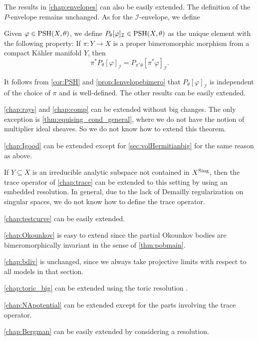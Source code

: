 The results in \cref{chap:envelopes} can also be easily extended. The definition of the $P$-envelope remains unchanged. As for the $\mathcal{I}$-envelope, we define
\begin{definition}\label{def:unibranch:L212}
    Given $\varphi\in \mathrm{PSH}(X,\theta)$, we define $P_{\theta}[\varphi]_{\mathcal{I}}\in \mathrm{PSH}(X,\theta)$ as the unique element with the following property: If $\pi\colon Y\rightarrow X$ is a proper bimeromorphic morphism from a compact K\"ahler manifold $Y$, then
    \[
        \pi^*P_{\theta}[\varphi]_{\mathcal{I}}=P_{\pi^*\theta}[\pi^*\varphi]_{\mathcal{I}}.
    \]
\end{definition}
It follows from \cref{cor:PSH} and \cref{prop:Ienvelopebimero} that $P_{\theta}[\varphi]_{\mathcal{I}}$ is independent of the choice of $\pi$ and is well-defined.
The other results can be easily extended.

\cref{chap:rays} and \cref{chap:comp} can be extended without big changes. The only exception is \cref{thm:equising_cond_general}, where we do not have the notion of multiplier ideal sheaves. So we do not know how to extend this theorem.

\cref{chap:Igood} can be extended except for \cref{sec:volHermitianbig} for the same reason as above.

If $Y\subseteq X$ is an irreducible analytic subspace not contained in $X^{\operatorname{Sing}}$, then the trace operator of \cref{chap:trace} can be extended to this setting by using an embedded resolution. In general, due to the lack of Demailly regularization on singular spaces, we do not know how to define the trace operator.

\cref{chap:testcurve} can be easily extended.

\cref{chap:Okounkov} is easy to extend since the partial Okounkov bodies are bimeromorphically invariant in the sense of \cref{thm:pobmain}.

\cref{chap:bdiv} is unchanged, since we always take projective limits with respect to all models in that section.

\cref{chap:toric_big} can be extended using the toric resolution \cite[Theorem~11.1.9]{CLS11}.

\cref{chap:NApotential} can be extended except for the parts involving the trace operator.

\cref{chap:Bergman} can be easily extended by considering a resolution.
